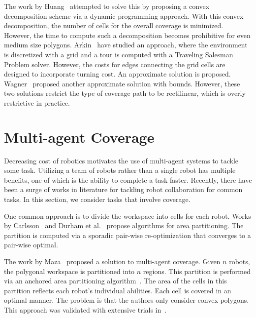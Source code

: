 \documentclass[../main.tex]{subfiles}
\begin{document}
The work by Huang~\cite{Huang2001optimal} attempted to solve this by proposing a convex decomposition scheme via a dynamic programming approach. With this convex decomposition, the number of cells for the overall coverage is minimized. However, the time to compute such a decomposition becomes prohibitive for even medium size polygons. Arkin~\cite{arkin2005optimal} have studied an approach, where the environment is discretized with a grid and a tour is computed with a Traveling Salesman Problem solver. However, the costs for edges connecting the grid cells are designed to incorporate turning cost. An approximate solution is proposed. Wagner~\cite{wagner2001approximation} proposed another approximate solution with bounds. However, these two solutions restrict the type of coverage path to be rectilinear, which is overly restrictive in practice.


\section{Multi-agent Coverage}
\label{section:multi_agent_coverage_lit_review}

Decreasing cost of robotics motivates the use of multi-agent systems to tackle some task. Utilizing a team of robots rather than a single robot has multiple benefits, one of which is the ability to complete a task faster. Recently, there have been a surge of works in literature for tackling robot collaboration for common tasks. In this section, we consider tasks that involve coverage.


One common approach is to divide the workspace into cells for each robot. Works by Carlsson~\cite{carlsson2012dividing} and Durham et al.~\cite{durham2012discrete} propose algorithms for area partitioning. The partition is computed via a sporadic pair-wise re-optimization that converges to a pair-wise optimal.

The work by Maza~\cite{maza2007multiple} proposed a solution to multi-agent coverage. Given $n$ robots, the polygonal workspace is partitioned into $n$ regions. This partition is performed via an anchored area partitioning algorithm~\cite{hert1998polygon}. The area of the cells in this partition reflects each robot's individual abilities. Each cell is covered in an optimal manner. The problem is that the authors only consider convex polygons. This approach was validated with extensive trials in~\cite{barrientos2011aerial}.
\end{document}
